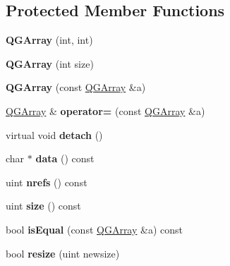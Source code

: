 \subsection*{Protected Member Functions}
\begin{DoxyCompactItemize}
\item 
\mbox{\label{class_q_g_array_a2e7994baf52fce803843a886dc76e683}} 
{\bfseries Q\+G\+Array} (int, int)
\item 
\mbox{\label{class_q_g_array_add5ddba43d2c6e80bd5465d2e14cfcee}} 
{\bfseries Q\+G\+Array} (int size)
\item 
\mbox{\label{class_q_g_array_acd319490fff3083fee3764d9b549717b}} 
{\bfseries Q\+G\+Array} (const \mbox{\hyperlink{class_q_g_array}{Q\+G\+Array}} \&a)
\item 
\mbox{\label{class_q_g_array_a3714d63f6b4156772f0a0175337c66f7}} 
\mbox{\hyperlink{class_q_g_array}{Q\+G\+Array}} \& {\bfseries operator=} (const \mbox{\hyperlink{class_q_g_array}{Q\+G\+Array}} \&a)
\item 
\mbox{\label{class_q_g_array_a538bae363739848c456c765a85caea6b}} 
virtual void {\bfseries detach} ()
\item 
\mbox{\label{class_q_g_array_adf4fed7e6d9f312f8e81233730d6f3a7}} 
char $\ast$ {\bfseries data} () const
\item 
\mbox{\label{class_q_g_array_a16a639f5e77583ed0e3e375f1e5d0e85}} 
uint {\bfseries nrefs} () const
\item 
\mbox{\label{class_q_g_array_ae6dbfeed46d8a27d56c74173a392a7bd}} 
uint {\bfseries size} () const
\item 
\mbox{\label{class_q_g_array_af35fe9ec0ef417915ff4d690c889d26d}} 
bool {\bfseries is\+Equal} (const \mbox{\hyperlink{class_q_g_array}{Q\+G\+Array}} \&a) const
\item 
\mbox{\label{class_q_g_array_ace6d58b8d81e8c9d0f99f9229263d6f5}} 
bool {\bfseries resize} (uint newsize)
\item 

\end{DoxyCompactItemize}
